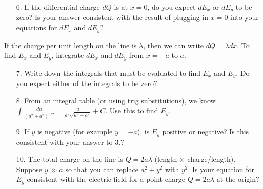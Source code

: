 \documentclass{article}
\begin{document}
\vskip 36.135pt

\begin{enumerate}

  \item[6.] If the differential charge $dQ$ is at $x=0$, do you expect $dE_x$ or $dE_y$ to be zero? Is your answer consistent with the result of plugging in $x=0$ into your equations for $dE_x$ and $dE_y$?

\end{enumerate}

\vskip 12.045pt

If the charge per unit length on the line is $\lambda$, then we can write $dQ=\lambda dx$. To find $E_x$ and $E_y$, integrate $dE_x$ and $dE_y$ from $x=-a$ to $a$.

\begin{enumerate}

  \item[7.] Write down the integrals that must be evaluated to find $E_x$ and $E_y$. Do you expect either of the integrals to be zero?

\end{enumerate}

\begin{enumerate}

  \item[8.] From an integral table (or using trig substitutions), we know $\displaystyle \int \frac{du}{(u^2+a^2)^{3/2}} = \frac{u}{a^2\sqrt{u^2+a^2}} + C$. Use this to find $E_y$.

\end{enumerate}

\vskip 72.27pt

\begin{enumerate}

  \item[9.] If $y$ is negative (for example $y=-a$), is $E_y$ positive or negative? Is this consistent with your answer to 3.?

\end{enumerate}

\vskip 36.135pt

\begin{enumerate}

  \item[10.] The total charge on the line is $Q=2a\lambda$ (length $\times$ charge/length). Suppose $y\gg a$ so that you can replace $a^2+y^2$ with $y^2$. Is your equation for $E_y$ consistent with the electric field for a point charge $Q=2a\lambda$ at the origin?

\end{enumerate}
\end{document}
